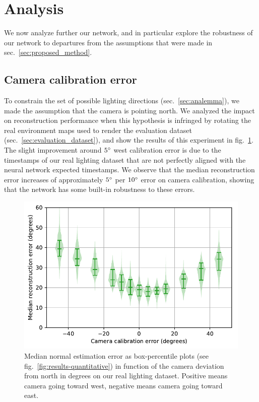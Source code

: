 \section{Analysis}
\label{sec:analysis}

We now analyze further our network, and in particular explore the robustness of our network to departures from the assumptions that were made in sec.~\ref{sec:proposed_method}. 

\subsection{Camera calibration error}

To constrain the set of possible lighting directions (sec.~\ref{sec:analemma}), we made the assumption that the camera is pointing north. We analyzed the impact on reconstruction performance when this hypothesis is infringed by rotating the real environment maps used to render the evaluation dataset (sec.~\ref{sec:evaluation_dataset}), and show the results of this experiment in fig.~\ref{fig:calibration_error_performance}. The slight improvement around $5^{\circ}$ west calibration error is due to the timestamps of our real lighting dataset that are not perfectly aligned with the neural network expected timestamps. We observe that the median reconstruction error increases of approximately $5^{\circ}$ per $10^{\circ}$ error on camera calibration, showing that the network has some built-in robustness to these errors. 


\begin{figure}[!t]
\centering
\includegraphics[width=0.7\linewidth]{figures/analysis/performance_calibration_error.pdf}
\caption[Surface reconstruction performance in function of camera calibration error]{Median normal estimation error as box-percentile plots (see fig.~\ref{fig:results-quantitative}) in function of the camera deviation from north in degrees on our real lighting dataset. Positive means camera going toward west, negative means camera going toward east. }
\label{fig:calibration_error_performance}
\end{figure}


